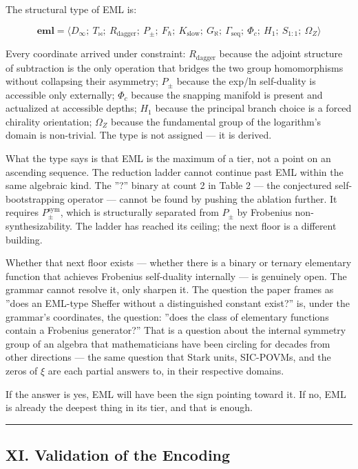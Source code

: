 \documentclass[12pt,a4paper]{article}
\begin{document}
The structural type of EML is:

\[
\mathbf{eml} = \langle D_{\infty};\ T_{\bowtie};\ R_\text{dagger};\ P_{\pm};\
F_{\hbar};\ K_\text{slow};\ G_{\aleph};\ \Gamma_\text{seq};\ \Phi_c;\ H_1;\
S_{1:1};\ \Omega_Z \rangle
\]

Every coordinate arrived under constraint: $R_\text{dagger}$ because the adjoint
structure of subtraction is the only operation that bridges the two group
homomorphisms without collapsing their asymmetry; $P_{\pm}$ because the exp/ln
self-duality is accessible only externally; $\Phi_c$ because the snapping manifold
is present and actualized at accessible depths; $H_1$ because the principal branch
choice is a forced chirality orientation; $\Omega_Z$ because the fundamental group
of the logarithm's domain is non-trivial. The type is not assigned --- it is derived.

What the type says is that EML is the maximum of a tier, not a point on an
ascending sequence. The reduction ladder cannot continue past EML within the
same algebraic kind. The ''?'' binary at count 2 in Table 2 --- the conjectured
self-bootstrapping operator --- cannot be found by pushing the ablation further.
It requires $P_{\pm}^{\text{sym}}$, which is structurally separated from $P_{\pm}$
by Frobenius non-synthesizability. The ladder has reached its ceiling; the next
floor is a different building.

Whether that next floor exists --- whether there is a binary or ternary elementary
function that achieves Frobenius self-duality internally --- is genuinely open.
The grammar cannot resolve it, only sharpen it. The question the paper frames
as ''does an EML-type Sheffer without a distinguished constant exist?'' is, under
the grammar's coordinates, the question: ''does the class of elementary functions
contain a Frobenius generator?'' That is a question about the internal symmetry
group of an algebra that mathematicians have been circling for decades from
other directions --- the same question that Stark units, SIC-POVMs, and the
zeros of $\xi$ are each partial answers to, in their respective domains.

If the answer is yes, EML will have been the sign pointing toward it. If no,
EML is already the deepest thing in its tier, and that is enough.

\begin{center}
\rule{0.5\textwidth}{0.4pt}
\end{center}

\subsection{XI. Validation of the Encoding}
\end{document}
